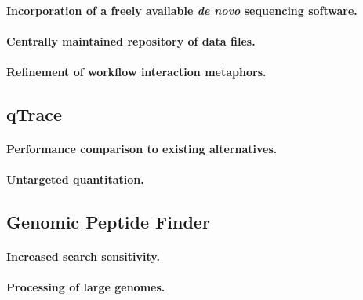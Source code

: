 \paragraph{Incorporation of a freely available {\em de novo} sequencing software.}

\paragraph{Centrally maintained repository of data files.}

\paragraph{Refinement of workflow interaction metaphors.}

\subsection{qTrace}

\paragraph{Performance comparison to existing alternatives.}

\paragraph{Untargeted quantitation.}

\subsection{Genomic Peptide Finder}

\paragraph{Increased search sensitivity.}

\paragraph{Processing of large genomes.}

